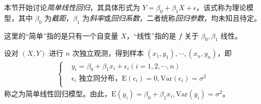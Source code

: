 \documentclass[../main.tex]{subfiles}
\begin{document}
本节开始讨论\emph{简单线性回归}，其具体形式为 $Y=\beta_0+\beta_1X+\epsilon$，该式称为理论模型，其中 $\beta_0$ 为\emph{截距}，$\beta_1$ 为\emph{斜率}或\emph{回归系数}，二者统称\emph{回归参数}，均未知且待定。

这里的“简单”指的是只有一个自变量 $X$，“线性”指的是 $f$ 关于 $\beta_0,\beta_1$ 线性。

设对 $(X,Y)$ 进行 $n$ 次独立观测，得到样本 $(x_1,y_1),\cdots,(x_n,y_n)$，即
\begin{align*}
    \left\{
    \begin{aligned}
         & y_i=\beta_0+\beta_1x_i+\epsilon_i(i=1,2,\cdots,n)                                       \\
         & \epsilon_i\text{ 独立同分布，}\mathrm E(\epsilon_i)=0,\mathrm{Var}(\epsilon_i)=\sigma^2 \\
    \end{aligned}
    \right.
\end{align*}
称之为简单线性回归模型。由此，$\mathrm E(y_i)=\beta_0+\beta_1x_i,\mathrm{Var}(y_i)=\sigma^2$。
\end{document}
